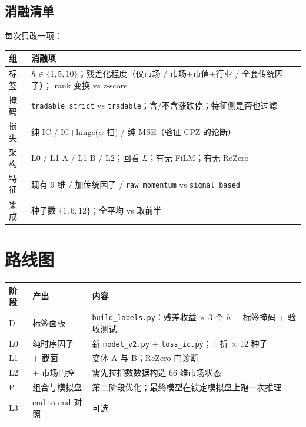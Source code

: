 \documentclass[11pt, a4paper]{ctexart}
\newcommand{\file}[1]{\texttt{\small #1}}
\begin{document}
\subsection{消融清单}
每次只改一项：

\begin{center}
\small
\begin{tabular}{lp{9cm}}
\toprule
组 & 消融项 \\
\midrule
标签 & $h \in \{1,5,10\}$；残差化程度（仅市场 / 市场$+$市值$+$行业 / 全套传统因子）；
       rank 变换 vs z-score \\
掩码 & \file{tradable\_strict} vs \file{tradable}；含/不含涨跌停；特征侧是否也过滤 \\
损失 & 纯 IC / IC$+$hinge($\alpha$ 扫) / 纯 MSE（验证 CPZ 的论断） \\
架构 & L0 / L1-A / L1-B / L2；回看 $L$；有无 FiLM；有无 ReZero \\
特征 & 现有 9 维 / 加传统因子 / \texttt{raw\_momentum} vs \texttt{signal\_based} \\
集成 & 种子数 $\{1, 6, 12\}$；全平均 vs 取前半 \\
\bottomrule
\end{tabular}
\end{center}

\section{路线图}
\label{sec:roadmap}

\begin{center}
\small
\begin{tabular}{llp{7.4cm}}
\toprule
阶段 & 产出 & 内容 \\
\midrule
D & 标签面板 & \file{build\_labels.py}：残差收益 $\times$ 3 个 $h$ $+$ 标签掩码 $+$ 验收测试 \\
L0 & 纯时序因子 & 新 \file{model\_v2.py} $+$ \file{loss\_ic.py}；三折 $\times$ 12 种子 \\
L1 & $+$ 截面 & 变体 A 与 B；ReZero 门诊断 \\
L2 & $+$ 市场门控 & 需先拉指数数据构造 66 维市场状态 \\
P & 组合与模拟盘 & 第二阶段优化；最终模型在锁定模拟盘上跑一次推理 \\
L3 & end-to-end 对照 & 可选 \\
\bottomrule
\end{tabular}
\end{center}
\end{document}
